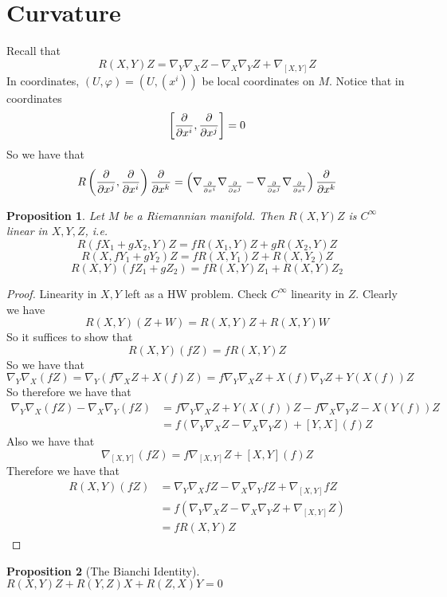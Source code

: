 \documentclass[a4paper]{article}
\newtheorem*{prop}{Proposition}
\begin{document}
\section*{Curvature}%

Recall that
\[
  R(X,Y)Z = \nabla_Y \nabla_X Z - \nabla_X \nabla_Y Z + \nabla_{[X,Y]} Z
\]
In coordinates, $(U, \varphi)= (U, (x^i))$ be local coordinates on $M$. Notice that in coordinates
\[
  \left[ \pdv{x^i}, \pdv{x^j} \right] = 0
\]
So we have that
\[
  R \left( \pdv{x^j}, \pdv{x^i} \right) \pdv{x^k} = \left(\nabla_{\pdv{x^i}} \nabla_{\pdv{x^j}} - \nabla_{\pdv{x^j}}\nabla_{\pdv{x^i}}\right) \pdv{x^k}
\]

\begin{prop}
 Let $M$ be a Riemannian manifold.  Then $R(X,Y)Z$ is $C^{\infty}$ linear in $X,Y,Z$, i.e.
     \[
       R(fX_1 + gX_2, Y)Z = fR(X_1,Y)Z + gR(X_2, Y)Z
     \]
     \[
       R(X, fY_1+gY_2)Z = fR(X,Y_1)Z + R(X, Y_2)Z
     \]
     \[
       R(X, Y)(fZ_1 + gZ_2) = fR(X,Y)Z_1 + R(X, Y)Z_2
     \]
\end{prop}

\begin{proof}
 Linearity in $X,Y$ left as a HW problem. Check $C^\infty$ linearity in $Z$. Clearly we have 
 \[
   R(X,Y)(Z+W) = R(X,Y)Z + R(X,Y)W
 \]
 So it suffices to show that
 \[
   R(X,Y)(fZ) = fR(X,Y)Z
 \]
 So we have that
 \[
   \nabla_Y \nabla_X (fZ) = \nabla_Y(f\nabla_X Z + X(f)Z) = f\nabla_Y\nabla_X Z + X(f)\nabla_Y Z + Y(X(f))Z
 \]
 So therefore we have that
 \[
   \begin{aligned}
     \nabla_Y \nabla_X (fZ) - \nabla_X \nabla_Y (fZ) &= f\nabla_Y\nabla_X Z + Y(X(f))Z - f\nabla_X\nabla_YZ - X(Y(f))Z \\
                                                     &= f \left( \nabla_Y \nabla_X Z - \nabla_X \nabla_Y Z \right) + \left[ Y,X \right](f) Z
   \end{aligned}
 \]
 Also we have that
 \[
   \nabla_{[X,Y]}(fZ) = f \nabla_{[X,Y]} Z + [X,Y](f) Z
 \]
 Therefore we have that
 \[
   \begin{aligned}
     R(X,Y)(fZ) &= \nabla_Y \nabla_X fZ - \nabla_X \nabla_Y fZ + \nabla_{[X,Y]} fZ \\
                &= f(\nabla_Y \nabla_X Z - \nabla_X \nabla_Y Z + \nabla_{[X,Y]} Z) \\
                &= f R(X,Y)Z
   \end{aligned}
 \]
\end{proof}

 \begin{prop}[The Bianchi Identity]
   $R(X,Y)Z + R(Y,Z)X + R(Z,X)Y = 0$
 \end{prop}
\end{document}
